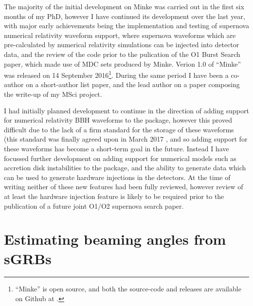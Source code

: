 \documentclass[openleft]{kentigern}
\theoremstyle{definition}
\begin{document}
The majority of the initial development on Minke was carried out in
the first six months of my PhD, however I have continued its
development over the last year, with major early achievements being
the implementation and testing of supernova numerical relativity
waveform support, where supernova waveforms which are pre-calculated
by numerical relativity simulations can be injected into detector
data, and the review of the code prior to the pulication of the O1
Burst Search paper\cite{2017PhRvD..95d2003A}, which made use of MDC
sets produced by Minke. Verion 1.0 of ``Minke'' was released on 14
September 2016\footnote{``Minke'' is open source, and both the
  source-code and releases are available on Github at
  .}.
During the same period I have been a co-author on a short-author list
paper, and the lead author on a paper composing the write-up of my
MSci project.

I had initially planned development to continue in the direction of
adding support for numerical relativity BBH waveforms to the package,
however this proved difficult due to the lack of a firm standard for
the storage of these waveforms (this standard was finally agreed upon
in March 2017 \cite{2017arXiv170301076S}, and so adding support for
these waveforms has become a short-term goal in the future. Instead I
have focussed further development on adding support for numerical
models such as accretion disk instabilities to the package, and the
ability to generate data which can be used to generate hardware
injections in the detectors. At the time of writing neither of these
new features had been fully reviewed, however review of at least the
hardware injection feature is likely to be required prior to the
publication of a future joint O1/O2 supernova search paper.


\section{Estimating beaming angles from sGRBs}
\label{sec:estim-beam-angl}
\end{document}

